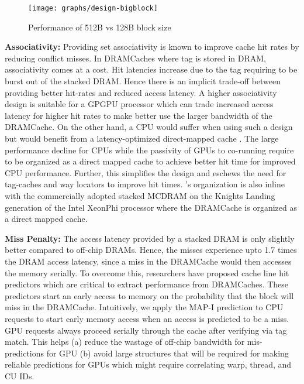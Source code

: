\begin{figure}[htbp]
   \texttt{[image: graphs/design-bigblock]}
   \caption{Performance of 512B vs 128B block size}	
   \label{fig:design-bigblock}
\end{figure}

\par \textbf{Associativity:} Providing set associativity is known to improve cache hit rates by reducing conflict misses. In DRAMCaches where tag is stored in DRAM,  associativity comes at a cost. Hit latencies increase due to the tag requiring to be burst out of the stacked DRAM. Hence there is an implicit trade-off between providing better hit-rates and reduced access latency. A higher associativity design is suitable for a GPGPU processor which can trade increased access latency for higher hit rates to make better use the larger bandwidth of the DRAMCache. On the other hand, a CPU would suffer when using such a design but would benefit from a latency-optimized direct-mapped cache \cite{alloy}. The large performance decline for CPUs while the passivity of GPUs to co-running require \cachename to be organized as a direct mapped cache to achieve better hit time for improved CPU performance. Further, this simplifies the design and eschews the need for tag-caches \cite{atcache} and way locators \cite{bimodal} to improve hit times. \cachename's organization is also inline with the commercially adopted stacked MCDRAM on the Knights Landing generation of the Intel XeonPhi processor \cite{xeonphi} where the DRAMCache is organized as a direct mapped cache.

\par \textbf{Miss Penalty:} The access latency provided by a stacked DRAM is only slightly better compared to off-chip DRAMs. Hence, the misses experience upto 1.7 times the DRAM access latency, since a miss in the DRAMCache would then accesses the memory serially. To overcome this, researchers have proposed cache line hit predictors \cite{loh-hill,alloy} which are critical to extract performance from DRAMCaches. These predictors start an early access to memory on the probability that the block will miss in the DRAMCache. Intuitively, we apply the MAP-I prediction \cite{alloy} to CPU requests to start early memory access when an access is predicted to be a miss. GPU requests always proceed serially through the cache after verifying via tag match. This helps (a) reduce the wastage of off-chip bandwidth for mis-predictions for GPU (b) avoid large structures that will be required for making reliable predictions for GPUs which might require correlating warp, thread, and CU IDs.

